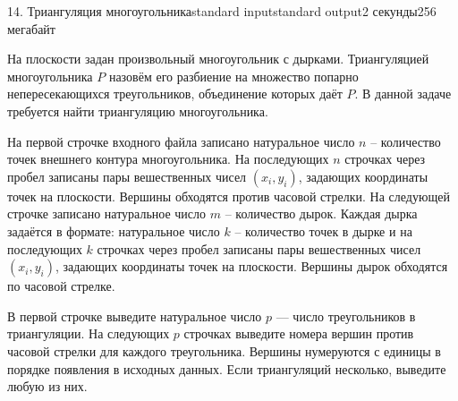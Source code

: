 \begin{problem}{14. Триангуляция многоугольника}{standard input}{standard output}{2 секунды}{256 мегабайт}

На плоскости задан произвольный многоугольник с дырками. Триангуляцией многоугольника $P$ назовём его разбиение на множество попарно непересекающихся треугольников, объединение которых даёт  $P$. В данной задаче требуется найти триангуляцию многоугольника.

\InputFile

На первой строчке входного файла записано натуральное число $n$ -- количество точек внешнего контура многоугольника. На последующих  $n$ строчках через пробел записаны пары вешественных чисел $(x_i, y_i)$, задающих координаты точек на плоскости. Вершины обходятся против часовой стрелки. На следующей строчке записано натуральное число $m$ -- количество дырок. Каждая дырка задаётся в формате: натуральное число $k$ -- количество точек в дырке и  на последующих  $k$ строчках через пробел записаны пары вешественных чисел $(x_i, y_i)$, задающих координаты точек на плоскости.  Вершины дырок обходятся по часовой стрелке.
\OutputFile

В первой строчке выведите натуральное число  $p$ --- число треугольников в триангуляции. На следующих $p$ строчках выведите номера вершин против часовой стрелки для каждого треугольника. Вершины нумеруются с единицы в порядке появления в исходных данных. Если триангуляций несколько, выведите любую из них.

\Examples

\begin{example}%
%
%
\end{example}

\end{problem}